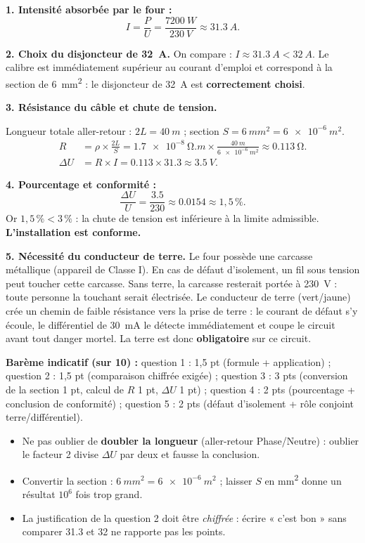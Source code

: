 \documentclass[11pt]{article}
\begin{document}
\begin{corrige}
\textbf{1. Intensité absorbée par le four :}
\[
I = \frac{P}{U} = \frac{\SI{7200}{W}}{\SI{230}{V}} \approx \SI{31,3}{A}.
\]

\textbf{2. Choix du disjoncteur de \SI{32}{A}.} On compare : $I \approx \SI{31,3}{A} < \SI{32}{A}$. Le calibre est immédiatement supérieur au courant d'emploi et correspond à la section de \SI{6}{mm^2} : le disjoncteur de \SI{32}{A} est \textbf{correctement choisi}.

\textbf{3. Résistance du câble et chute de tension.}

Longueur totale aller-retour : $2L = \SI{40}{m}$ ; section $S = \SI{6}{mm^2} = \SI{6e-6}{m^2}$.
\begin{align*}
R &= \rho \times \frac{2L}{S} = \SI{1,7e-8}{\ohm.m} \times \frac{\SI{40}{m}}{\SI{6e-6}{m^2}} \approx \SI{0,113}{\ohm}.\\
\Delta U &= R \times I = \num{0,113} \times \num{31,3} \approx \SI{3,5}{V}.
\end{align*}

\textbf{4. Pourcentage et conformité :}
\[
\frac{\Delta U}{U} = \frac{\num{3,5}}{\num{230}} \approx \num{0,0154} \approx 1,5\,\%.
\]
Or $1,5\,\% < 3\,\%$ : la chute de tension est inférieure à la limite admissible. \textbf{L'installation est conforme.}

\textbf{5. Nécessité du conducteur de terre.} Le four possède une carcasse métallique (appareil de Classe I). En cas de défaut d'isolement, un fil sous tension peut toucher cette carcasse. Sans terre, la carcasse resterait portée à \SI{230}{V} : toute personne la touchant serait électrisée. Le conducteur de terre (vert/jaune) crée un chemin de faible résistance vers la prise de terre : le courant de défaut s'y écoule, le différentiel de \SI{30}{mA} le détecte immédiatement et coupe le circuit avant tout danger mortel. La terre est donc \textbf{obligatoire} sur ce circuit.

\medskip
\textbf{Barème indicatif (sur 10) :} question 1 : 1,5 pt (formule + application) ; question 2 : 1,5 pt (comparaison chiffrée exigée) ; question 3 : 3 pts (conversion de la section 1 pt, calcul de $R$ 1 pt, $\Delta U$ 1 pt) ; question 4 : 2 pts (pourcentage + conclusion de conformité) ; question 5 : 2 pts (défaut d'isolement + rôle conjoint terre/différentiel).
\end{corrige}

\begin{attention}
\begin{itemize}
\item Ne pas oublier de \textbf{doubler la longueur} (aller-retour Phase/Neutre) : oublier le facteur 2 divise $\Delta U$ par deux et fausse la conclusion.
\item Convertir la section : $\SI{6}{mm^2} = \SI{6e-6}{m^2}$ ; laisser $S$ en mm\textsuperscript{2} donne un résultat $10^6$ fois trop grand.
\item La justification de la question 2 doit être \emph{chiffrée} : écrire « c'est bon » sans comparer \num{31,3} et \num{32} ne rapporte pas les points.
\end{itemize}
\end{attention}
\end{document}
